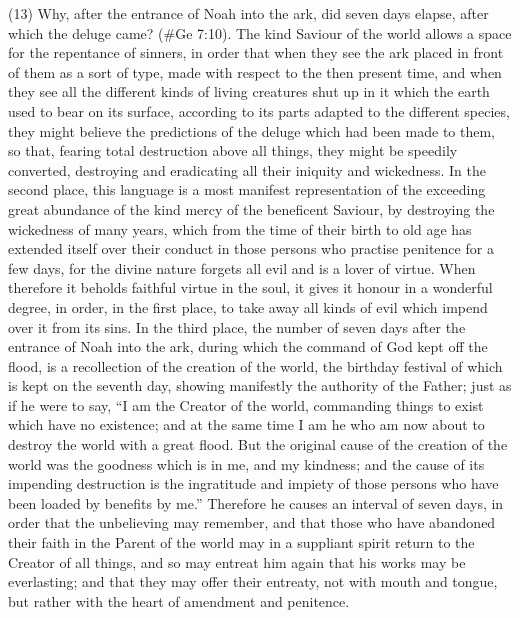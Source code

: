 (13) Why, after the entrance of Noah into the ark, did seven days elapse, after which the deluge
came? (\#Ge 7:10). The kind Saviour of the world allows a space for the repentance of
sinners, in order that when they see the ark placed in front of them as a sort of type, made with
respect to the then present time, and when they see all the different kinds of living creatures shut
up in it which the earth used to bear on its surface, according to its parts adapted to the different
species, they might believe the predictions of the deluge which had been made to them, so that,
fearing total destruction above all things, they might be speedily converted, destroying and
eradicating all their iniquity and wickedness. In the second place, this language is a most manifest
representation of the exceeding great abundance of the kind mercy of the beneficent Saviour, by
destroying the wickedness of many years, which from the time of their birth to old age has
extended itself over their conduct in those persons who practise penitence for a few days, for the
divine nature forgets all evil and is a lover of virtue. When therefore it beholds faithful virtue in the
soul, it gives it honour in a wonderful degree, in order, in the first place, to take away all kinds of evil
which impend over it from its sins. In the third place, the number of seven days after the entrance
of Noah into the ark, during which the command of God kept off the flood, is a recollection of the
creation of the world, the birthday festival of which is kept on the seventh day, showing manifestly
the authority of the Father; just as if he were to say, ``I am the Creator of the world, commanding
things to exist which have no existence; and at the same time I am he who am now about to
destroy the world with a great flood. But the original cause of the creation of the world was the
goodness which is in me, and my kindness; and the cause of its impending destruction is the
ingratitude and impiety of those persons who have been loaded by benefits by me.'' Therefore he
causes an interval of seven days, in order that the unbelieving may remember, and that those who
have abandoned their faith in the Parent of the world may in a suppliant spirit return to the Creator
of all things, and so may entreat him again that his works may be everlasting; and that they may
offer their entreaty, not with mouth and tongue, but rather with the heart of amendment and
penitence.

